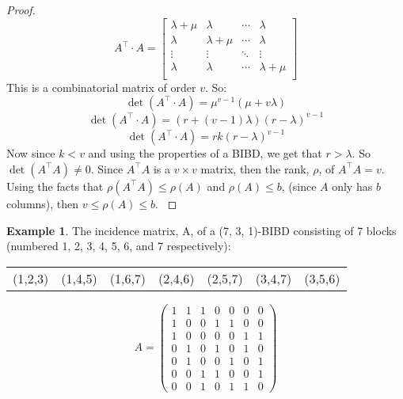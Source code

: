 \documentclass[12pt]{article}
\theoremstyle{definition}
\newtheorem{ex}[thm]{Example}
\begin{document}
\begin{proof}
\begin{equation}
A^\intercal \cdot A = \begin{bmatrix} 
\lambda + \mu & \lambda & \cdots & \lambda \\
\lambda & \lambda + \mu & \cdots & \lambda \\
\vdots & \vdots & \ddots & \vdots \\
\lambda & \lambda & \cdots & \lambda + \mu \\
\end{bmatrix}
\end{equation}
This is a combinatorial matrix of order $v$.
So: 
\begin{equation}
\displaystyle \det \left({A^\intercal \cdot A}\right) = \displaystyle \mu^{v-1} \left ({\mu + v \lambda}\right)
\end{equation}
\begin{equation}
\displaystyle \det \left({A^\intercal \cdot A}\right) = \displaystyle \left ({r + \left({v-1}\right) \lambda}\right) \left({r - \lambda}\right)^{v-1}
\end{equation}
\begin{equation}
\displaystyle \det \left({A^\intercal \cdot A}\right) = \displaystyle r k \left({r - \lambda}\right)^{v-1}
\end{equation}
Now since $k < v$ and using the properties of a BIBD, we get that $r > \lambda$. So $\det \left({A^\intercal A}\right) \ne 0$. Since $A^\intercal A$ is a $v\times{v}$ matrix, then the rank, $\rho$, of $A^\intercal A = v$.
Using the facts that $\rho \left({A^\intercal A}\right) \le \rho \left({A}\right)$ and $\rho \left({A}\right) \le b$, (since $A$ only has $b$ columns), then $v \le \rho \left({A}\right) \le b$. \cite{FisherInequality}
\end{proof}
\begin{ex}\label{incidence-matrix}
The incidence matrix, A, of a (7, 3, 1)-BIBD consisting of 7 blocks (numbered 1, 2, 3, 4, 5, 6, and 7 respectively):
\begin{center}
\begin{tabular}{lllllll} 
(1,2,3) & (1,4,5) & (1,6,7) & (2,4,6) & (2,5,7) &  (3,4,7) & (3,5,6) \\
\end{tabular}
\end{center}
\[A = \left( \begin{array}{ccccccc}
1 & 1 & 1 & 0 & 0 & 0 & 0 \\
1 & 0 & 0 & 1 & 1 & 0 & 0 \\
1 & 0 & 0 & 0 & 0 & 1 & 1 \\
0 & 1 & 0 & 1 & 0 & 1 & 0 \\
0 & 1 & 0 & 0 & 1 & 0 & 1 \\
0 & 0 & 1 & 1 & 0 & 0 & 1 \\
0 & 0 & 1 & 0 & 1 & 1 & 0 \end{array} \right)\]
\end{ex}
\end{document}
